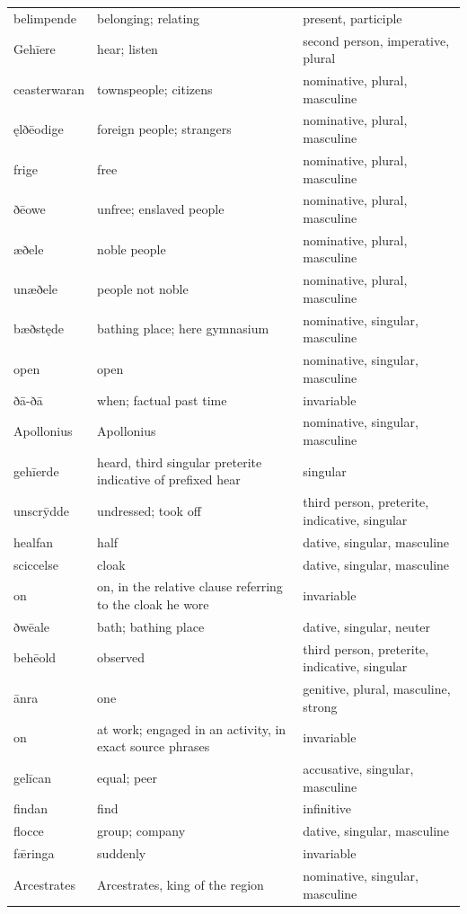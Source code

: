 \begin{longtable}{@{}>{\raggedright\arraybackslash}p{26mm}>{\raggedright\arraybackslash}p{44.5mm}>{\raggedright\arraybackslash}p{47.88mm}@{}}
belimpende & belonging; relating & present, participle \\
Gehīere & hear; listen & second person, imperative, plural \\
ceasterwaran & townspeople; citizens & nominative, plural, masculine \\
ęlðēodige & foreign people; strangers & nominative, plural, masculine \\
frige & free & nominative, plural, masculine \\
ðēowe & unfree; enslaved people & nominative, plural, masculine \\
æðele & noble people & nominative, plural, masculine \\
unæðele & people not noble & nominative, plural, masculine \\
bæðstęde & bathing place; here gymnasium & nominative, singular, masculine \\
open & open & nominative, singular, masculine \\
ðā-ðā & when; factual past time & invariable \\
Apollonius & Apollonius & nominative, singular, masculine \\
gehīerde & heard, third singular preterite indicative of prefixed hear & singular \\
unscrȳdde & undressed; took off & third person, preterite, indicative, singular \\
healfan & half & dative, singular, masculine \\
sciccelse & cloak & dative, singular, masculine \\
on & on, in the relative clause referring to the cloak he wore & invariable \\
ðwēale & bath; bathing place & dative, singular, neuter \\
behēold & observed & third person, preterite, indicative, singular \\
ānra & one & genitive, plural, masculine, strong \\
on & at work; engaged in an activity, in exact source phrases & invariable \\
gelīcan & equal; peer & accusative, singular, masculine \\
findan & find & infinitive \\
flocce & group; company & dative, singular, masculine \\
fǣringa & suddenly & invariable \\
Arcestrates & Arcestrates, king of the region & nominative, singular, masculine \\

\end{longtable}
